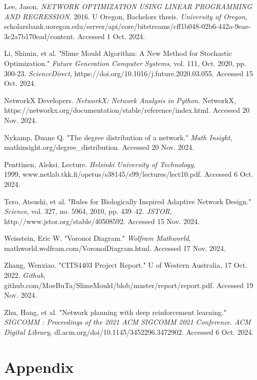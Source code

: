 \documentclass[11pt]{article}
\begin{document}
Lee, Jason. \emph{NETWORK OPTIMIZATION USING LINEAR PROGRAMMING AND
REGRESSION}. 2016. U Oregon, Bachelor\textquotesingle s thesis.
\emph{University of Oregon},
scholarsbank.uoregon.edu/server/api/core/bitstreams/cff1b048-02b6-442a-9eae-3c2a7b170ead/content.
Accessed 1 Oct. 2024.

Li, Shimin, et al. "Slime Mould Algorithm: A New Method for Stochastic
Optimization." \emph{Future Generation Computer Systems}, vol. 111, Oct.
2020, pp. 300-23. \emph{ScienceDirect},
https://doi.org/10.1016/j.future.2020.03.055. Accessed 15 Oct. 2024.

NetworkX Developers. \emph{NetworkX: Network Analysis in Python}.
NetworkX,\\
https://networkx.org/documentation/stable/reference/index.html. Accessed
20 Nov. 2024.

Nykamp, Duane Q. "The degree distribution of a network." \emph{Math
Insight}, mathinsight.org/degree\_distribution. Accessed 20 Nov. 2024.

Penttinen, Aleksi. Lecture. \emph{Helsinki University of Technology},\\
1999, www.netlab.tkk.fi/opetus/s38145/s99/lectures/lect10.pdf. Accessed
6 Oct. 2024.

Tero, Atsushi, et al. "Rules for Biologically Inspired Adaptive Network
Design." \emph{Science}, vol. 327, no. 5964, 2010, pp. 439--42.
\emph{JSTOR}, http://www.jstor.org/stable/40508592. Accessed 15 Nov.
2024.

Weisstein, Eric W. "Voronoi Diagram." \emph{Wolfram Mathworld},
mathworld.wolfram.com/VoronoiDiagram.html. Accessed 17 Nov. 2024.

Zhang, Wenxiao. "CITS4403 Project Report." U of Western Australia, 17
Oct. 2022. \emph{Github},\\
github.com/MoeBuTa/SlimeMould/blob/master/report/report.pdf. Accessed 19 Nov. 2024.

Zhu, Hang, et al. "Network planning with deep reinforcement learning."
\emph{SIGCOMM : Proceedings of the 2021 ACM SIGCOMM
2021 Conference}. \emph{ACM Digital Library},
dl.acm.org/doi/10.1145/3452296.3472902. Accessed 6 Oct. 2024.
\newpage
\section{Appendix}
\end{document}
